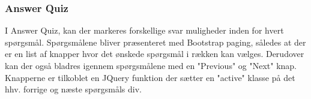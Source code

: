 \subsubsection{Answer Quiz}
I Answer Quiz, kan der markeres forskellige svar muligheder inden for hvert spørgsmål. Spørgsmålene bliver præsenteret med Bootstrap paging, således at der er en list af knapper hvor det ønskede spørgsmål i rækken kan vælges. Derudover kan der også bladres igennem spørgsmålene med en "Previous" og "Next" knap. Knapperne er tilkoblet en JQuery funktion der sætter en "active" klasse på det hhv. forrige og næste spørgsmåls div.

